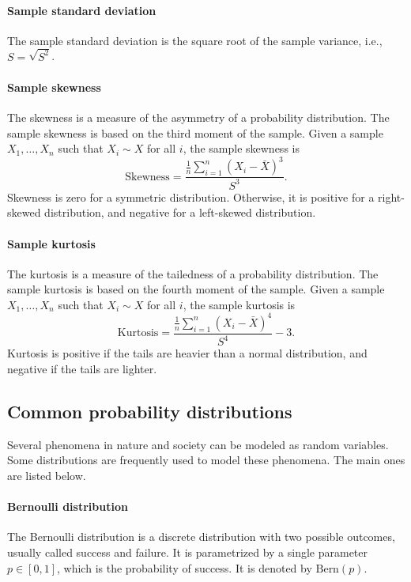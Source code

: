 \paragraph{Sample standard deviation}  The sample standard deviation is the square root
of the sample variance, i.e., $S = \sqrt{S^2}$.

\paragraph{Sample skewness}  The skewness is a measure of the asymmetry of a probability
distribution.  The sample skewness is based on the third moment of the sample.  Given a
sample $X_1, \dots, X_n$ such that $X_i \sim X$ for all $i$, the sample skewness is
\begin{equation*}
  \text{Skewness} = \frac{\frac{1}{n} \sum_{i = 1}^n (X_i - \bar{X})^3}{S^3}\text{.}
\end{equation*}
Skewness is zero for a symmetric distribution.  Otherwise, it is positive for a right-skewed distribution,
and negative for a left-skewed distribution.

\paragraph{Sample kurtosis}  The kurtosis is a measure of the tailedness of a probability
distribution.  The sample kurtosis is based on the fourth moment of the sample.  Given a
sample $X_1, \dots, X_n$ such that $X_i \sim X$ for all $i$, the sample kurtosis is
\begin{equation*}
  \text{Kurtosis} = \frac{\frac{1}{n} \sum_{i = 1}^n (X_i - \bar{X})^4}{S^4} - 3\text{.}
\end{equation*}
Kurtosis is positive if the tails are heavier than a normal distribution, and negative if
the tails are lighter.

\subsection{Common probability distributions}

Several phenomena in nature and society can be modeled as random variables.  Some
distributions are frequently used to model these phenomena.  The main ones are
listed below.

\paragraph{Bernoulli distribution}  The Bernoulli distribution is a discrete
distribution with two possible outcomes, usually called success and failure.  It is
parametrized by a single parameter $p \in [0, 1]$, which is the probability of
success.  It is denoted by $\text{Bern}(p)$.

